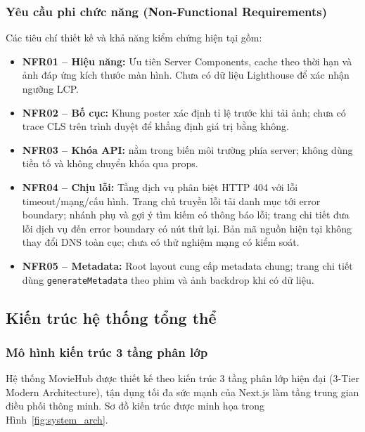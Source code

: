 \documentclass[12pt,a4paper]{extarticle}
\begin{document}
\subsubsection{Yêu cầu phi chức năng (Non-Functional Requirements)}
Các tiêu chí thiết kế và khả năng kiểm chứng hiện tại gồm:
\begin{itemize}[noitemsep]
    \item \textbf{NFR01 -- Hiệu năng:} Ưu tiên Server Components, cache theo thời hạn và ảnh đáp ứng kích thước màn hình. Chưa có dữ liệu Lighthouse để xác nhận ngưỡng LCP.
    \item \textbf{NFR02 -- Bố cục:} Khung poster xác định tỉ lệ trước khi tải ảnh; chưa có trace CLS trên trình duyệt để khẳng định giá trị bằng không.
    \item \textbf{NFR03 -- Khóa API:}  nằm trong biến môi trường phía server; không dùng tiền tố  và không chuyển khóa qua props.
    \item \textbf{NFR04 -- Chịu lỗi:} Tầng dịch vụ phân biệt HTTP 404 với lỗi timeout/mạng/cấu hình. Trang chủ truyền lỗi tải danh mục tới error boundary; nhánh phụ và gợi ý tìm kiếm có thông báo lỗi; trang chi tiết đưa lỗi dịch vụ đến error boundary có nút thử lại. Bản mã nguồn hiện tại không thay đổi DNS toàn cục; chưa có thử nghiệm mạng có kiểm soát.
    \item \textbf{NFR05 -- Metadata:} Root layout cung cấp metadata chung; trang chi tiết dùng \texttt{generateMetadata} theo phim và ảnh backdrop khi có dữ liệu.
\end{itemize}

\subsection{Kiến trúc hệ thống tổng thể}

\subsubsection{Mô hình kiến trúc 3 tầng phân lớp}
Hệ thống MovieHub được thiết kế theo kiến trúc 3 tầng phân lớp hiện đại (3-Tier Modern Architecture), tận dụng tối đa sức mạnh của Next.js làm tầng trung gian điều phối thông minh. Sơ đồ kiến trúc được minh họa trong Hình~\ref{fig:system_arch}.
\end{document}
